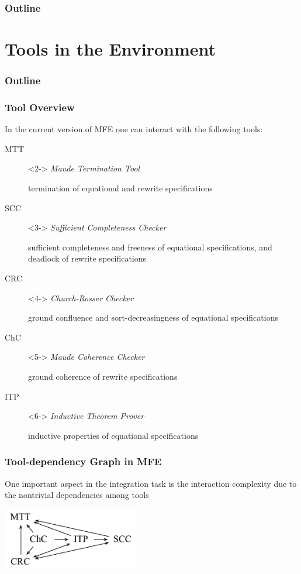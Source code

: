 \documentclass{beamer}
\begin{document}
\begin{frame}
  \frametitle{Outline}
  \tableofcontents
\end{frame}

\section{Tools in the Environment}

\begin{frame}
  \frametitle{Outline}
  \tableofcontents[currentsection]
\end{frame}

\begin{frame}
  \frametitle{Tool Overview}

  In the current version of MFE one can interact with the following tools:

  \begin{description}
    \item[MTT]<2-> {\em Maude Termination Tool}
      
      termination of equational and rewrite specifications

    \item[SCC]<3-> {\em Sufficient Completeness Checker}
      
      sufficient completeness and freeness of equational specifications,
      and deadlock of rewrite specifications

    \item[CRC]<4-> {\em Church-Rosser Checker}
      
      ground confluence and sort-decreasingness of equational specifications

    \item[ChC]<5-> {\em Maude Coherence Checker}
      
      ground coherence of rewrite specifications

    \item[ITP]<6-> {\em Inductive Theorem Prover}
      
      inductive properties of equational specifications

  \end{description}
\end{frame}

\begin{frame}
  \frametitle{Tool-dependency Graph in MFE}

  One important aspect in the integration task is the interaction complexity due to the
  nontrivial dependencies among tools

  \begin{center}
    \includegraphics[width=6cm]{tool-dep}
  \end{center}
\end{frame}
\end{document}
